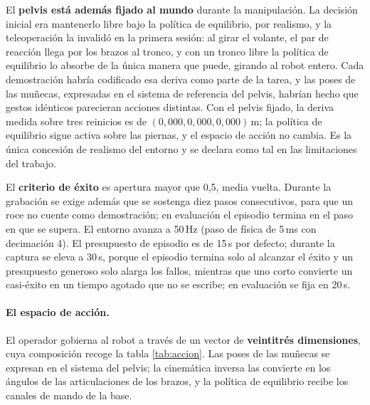 El \textbf{pelvis está además fijado al mundo} durante la manipulación. La decisión inicial era
mantenerlo libre bajo la política de equilibrio, por realismo, y la teleoperación la invalidó en
la primera sesión: al girar el volante, el par de reacción llega por los brazos al tronco, y con un
tronco libre la política de equilibrio lo absorbe de la única manera que puede, girando al robot
entero. Cada demostración habría codificado esa deriva como parte de la tarea, y las poses de las
muñecas, expresadas en el sistema de referencia del pelvis, habrían hecho que gestos idénticos
parecieran acciones distintas. Con el pelvis fijado, la deriva medida sobre tres reinicios es de
$(0{,}000, 0{,}000, 0{,}000)$\,m; la política de equilibrio sigue activa sobre las piernas, y el
espacio de acción no cambia. Es la única concesión de realismo del entorno y se declara como tal
en las limitaciones del trabajo.

El \textbf{criterio de éxito} es apertura mayor que 0,5, media vuelta. Durante la grabación se
exige además que se sostenga diez pasos consecutivos, para que un roce no cuente como
demostración; en evaluación el episodio termina en el paso en que se supera. El entorno avanza a 50\,Hz (paso de física de 5\,ms con
decimación 4). El presupuesto de episodio es de 15\,s por defecto; durante la captura se eleva a
30\,s, porque el episodio termina solo al alcanzar el éxito y un presupuesto generoso solo alarga
los fallos, mientras que uno corto convierte un casi-éxito en un tiempo agotado que no se escribe;
en evaluación se fija en 20\,s.

\paragraph{El espacio de acción.} El operador gobierna al robot a través de un vector de
\textbf{veintitrés dimensiones}, cuya composición recoge la tabla \ref{tab:accion}. Las poses de
las muñecas se expresan en el sistema del pelvis; la cinemática inversa las convierte en los
ángulos de las articulaciones de los brazos, y la política de equilibrio recibe los canales de
mando de la base.

